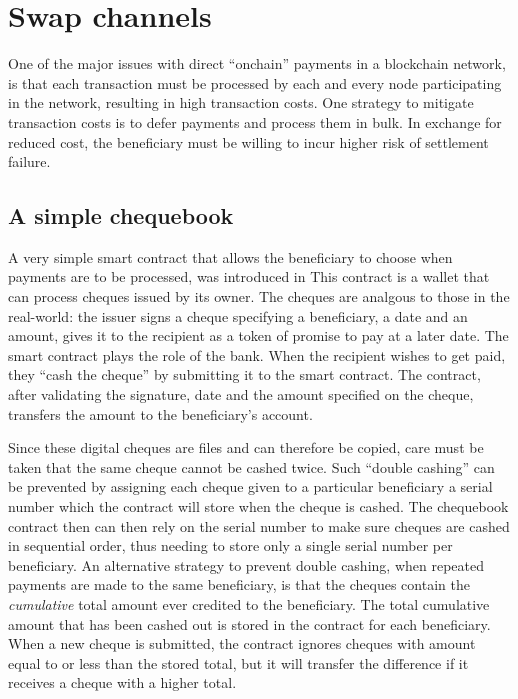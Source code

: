 
\section{Swap channels}

One of the major issues with direct ``onchain'' payments in a blockchain network, is that each transaction must be processed
by each and every node participating in the network, resulting in high transaction costs.
One strategy to mitigate transaction costs is to defer payments and process them in bulk. 
In exchange for reduced cost, the beneficiary must be willing to incur higher risk of settlement failure.

\subsection{A simple chequebook}

A very simple smart contract that allows the beneficiary to choose when payments are to be processed, was introduced in \cite{ethersphere2016sw3}
This  contract is a wallet that can process cheques issued by its owner. The cheques are
analgous to those in the real-world: the issuer signs a cheque specifying a beneficiary, a date and an amount,
gives it to the recipient as a token of promise to pay at a later date. The smart contract plays the
role of the bank. When the recipient wishes to get paid, they ``cash the cheque'' by submitting it to the smart contract. The contract, after validating the signature, date and the amount specified on the cheque, transfers the amount to the beneficiary's account.



Since these digital cheques are files and can therefore be copied, care must be taken that the same cheque cannot be cashed twice. Such ``double cashing'' can be prevented by assigning each cheque given to a particular beneficiary a serial number which the contract will store when the cheque is cashed. The chequebook contract then can then rely on the serial number to make sure cheques are cashed in sequential order, thus needing to store only a single serial number per beneficiary.
An alternative strategy to prevent double cashing, when repeated payments are made to the same beneficiary, is that the cheques contain the \emph{cumulative} total amount ever credited to the beneficiary. The total cumulative amount that has been cashed out is stored in the contract for each beneficiary. When a new cheque is submitted, the contract ignores cheques with amount equal to or less than the stored total, but it will transfer the difference if it receives a cheque with a higher total.

